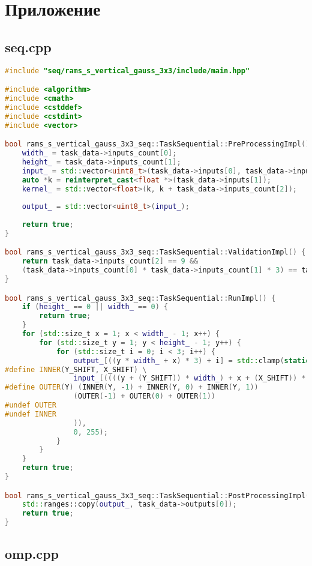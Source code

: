 \documentclass[12pt]{article}
\begin{document}
\newpage

\section{Приложение}

\subsection{seq.cpp}

\begin{lstlisting}[language=C++]
#include "seq/rams_s_vertical_gauss_3x3/include/main.hpp"

#include <algorithm>
#include <cmath>
#include <cstddef>
#include <cstdint>
#include <vector>

bool rams_s_vertical_gauss_3x3_seq::TaskSequential::PreProcessingImpl() {
	width_ = task_data->inputs_count[0];
	height_ = task_data->inputs_count[1];
	input_ = std::vector<uint8_t>(task_data->inputs[0], task_data->inputs[0] + (height_ * width_ * 3));
	auto *k = reinterpret_cast<float *>(task_data->inputs[1]);
	kernel_ = std::vector<float>(k, k + task_data->inputs_count[2]);
	
	output_ = std::vector<uint8_t>(input_);
	
	return true;
}

bool rams_s_vertical_gauss_3x3_seq::TaskSequential::ValidationImpl() {
	return task_data->inputs_count[2] == 9 &&
	(task_data->inputs_count[0] * task_data->inputs_count[1] * 3) == task_data->outputs_count[0];
}

bool rams_s_vertical_gauss_3x3_seq::TaskSequential::RunImpl() {
	if (height_ == 0 || width_ == 0) {
		return true;
	}
	for (std::size_t x = 1; x < width_ - 1; x++) {
		for (std::size_t y = 1; y < height_ - 1; y++) {
			for (std::size_t i = 0; i < 3; i++) {
				output_[((y * width_ + x) * 3) + i] = std::clamp(static_cast<int>(std::round(
#define INNER(Y_SHIFT, X_SHIFT) \
				input_[((((y + (Y_SHIFT)) * width_) + x + (X_SHIFT)) * 3) + i] * kernel_[4 + (3 * (Y_SHIFT)) + (X_SHIFT)]
#define OUTER(Y) (INNER(Y, -1) + INNER(Y, 0) + INNER(Y, 1))
				(OUTER(-1) + OUTER(0) + OUTER(1))
#undef OUTER
#undef INNER
				)),
				0, 255);
			}
		}
	}
	return true;
}

bool rams_s_vertical_gauss_3x3_seq::TaskSequential::PostProcessingImpl() {
	std::ranges::copy(output_, task_data->outputs[0]);
	return true;
}
\end{lstlisting}

\subsection{omp.cpp}
\end{document}
